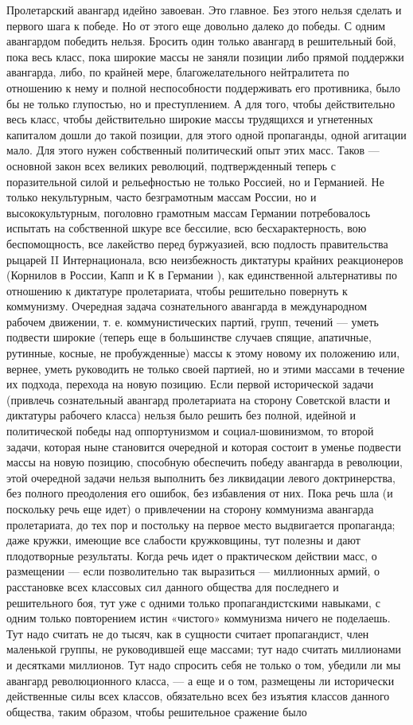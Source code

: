 \documentclass[12pt]{article}
\newcommand{\parnum}{(\arabic{parcount})}
\newcounter{parcount}
\newenvironment{parnumbers}{%
  \par%
  \everypar{\noindent \stepcounter{parcount}\marginpar[]{\parnum}}%
}{}
\begin{document}
\begin{parnumbers}
Пролетарский авангард идейно завоеван. Это главное. Без этого нельзя сделать и первого шага к победе. Но от этого еще довольно далеко до победы. С одним авангардом победить нельзя. Бросить один только авангард в решительный бой, пока весь класс, пока широкие массы не заняли позиции либо прямой поддержки авангарда, либо, по крайней мере, благожелательного нейтралитета по отношению к нему и полной неспособности поддерживать его противника, было бы не только глупостью, но и преступлением. А для того, чтобы действительно весь класс, чтобы действительно широкие массы трудящихся и угнетенных капиталом дошли до такой позиции, для этого одной пропаганды, одной агитации мало. Для этого нужен собственный политический опыт этих масс. Таков — основной закон всех великих революций, подтвержденный теперь с поразительной силой и рельефностью не только Россией, но и Германией. Не только некультурным, часто безграмотным массам России, но и высококультурным, поголовно грамотным массам Германии потребовалось испытать на собственной шкуре все бессилие, всю бесхарактерность, вою беспомощность, все лакейство перед буржуазией, всю подлость правительства рыцарей II Интернационала, всю неизбежность диктатуры крайних реакционеров (Корнилов в России, Капп и К в Германии ), как единственной альтернативы по отношению к диктатуре пролетариата, чтобы решительно повернуть к коммунизму. Очередная задача сознательного авангарда в международном рабочем движении, т. е. коммунистических партий, групп, течений — уметь подвести широкие (теперь еще в большинстве случаев спящие, апатичные, рутинные, косные, не пробужденные) массы к этому новому их положению или, вернее, уметь руководить не только своей партией, но и этими массами в течение их подхода, перехода на новую позицию. Если первой исторической задачи (привлечь сознательный авангард пролетариата на сторону Советской власти и диктатуры рабочего класса) нельзя было решить без полной, идейной и политической победы над оппортунизмом и социал-шовинизмом, то второй задачи, которая ныне становится очередной и которая состоит в уменье подвести массы на новую позицию, способную обеспечить победу авангарда в революции, этой очередной задачи нельзя выполнить без ликвидации левого доктринерства, без полного преодоления его ошибок, без избавления от них. Пока речь шла (и поскольку речь еще идет) о привлечении на сторону коммунизма авангарда пролетариата, до тех пор и постольку на первое место выдвигается пропаганда; даже кружки, имеющие все слабости кружковщины, тут полезны и дают плодотворные результаты. Когда речь идет о практическом действии масс, о размещении — если позволительно так выразиться — миллионных армий, о расстановке всех классовых сил данного общества для последнего и решительного боя, тут уже с одними только пропагандистскими навыками, с одним только повторением истин «чистого» коммунизма ничего не поделаешь. Тут надо считать не до тысяч, как в сущности считает пропагандист, член маленькой группы, не руководившей еще массами; тут надо считать миллионами и десятками миллионов. Тут надо спросить себя не только о том, убедили ли мы авангард революционного класса, — а еще и о том, размещены ли исторически действенные силы всех классов, обязательно всех без изъятия классов данного общества, таким образом, чтобы решительное сражение было 
\end{parnumbers}
\end{document}
